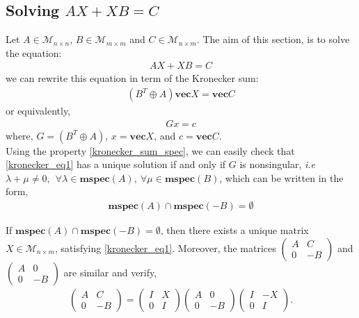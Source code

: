 \subsection{Solving $AX+XB=C$}
Let $A \in \mathcal{M}_{n \times n}$, $B \in \mathcal{M}_{m \times m}$ and $C \in \mathcal{M}_{n \times m}$. The aim of this section, is to solve the equation:
\begin{align}
\label{kronecker_eq1}
AX+XB=C
\end{align}
we can rewrite this equation in term of the Kronecker sum:
\begin{align}
(B^T \oplus A)\mathbf{vec}X =\mathbf{vec}C
\end{align}
or equivalently,
\begin{align}
G x = c
\end{align}
where,
$G = (B^T \oplus A)$, $x = \mathbf{vec}X $, and $c = \mathbf{vec}C$.
\\
Using the property \ref{kronecker_sum_spec}, we can easily check that \ref{kronecker_eq1} has a unique solution if and only if $G$ is nonsingular, \textit{i.e} $\lambda +  \mu \neq 0,~~\forall \lambda \in \mathbf{mspec}(A),~\forall \mu \in \mathbf{mspec}(B)$, which can be written in the form,
\begin{align}
\mathbf{mspec}(A) \cap \mathbf{mspec}(-B) = \emptyset
\end{align}

\begin{proposition}
If $\mathbf{mspec}(A) \cap \mathbf{mspec}(-B) = \emptyset$, then there exists a unique matrix $X \in \mathcal{M}_{n \times m}$, satisfying \ref{kronecker_eq1}. Moreover, the matrices $\left(\begin{array}{cc}
A & C
\\
0 & -B
\end{array}\right)$ and $\left(\begin{array}{cc}
A & 0
\\
0 & -B
\end{array}\right)$ are similar and verify,
\begin{align}
\left(\begin{array}{cc}
A & C
\\
0 & -B
\end{array}\right) = \left(\begin{array}{cc}
I & X
\\
0 & I
\end{array}\right)
\left(\begin{array}{cc}
A & 0
\\
0 & -B
\end{array}\right)
\left(\begin{array}{cc}
I & -X
\\
0 & I
\end{array}\right).
\end{align}
\end{proposition}

